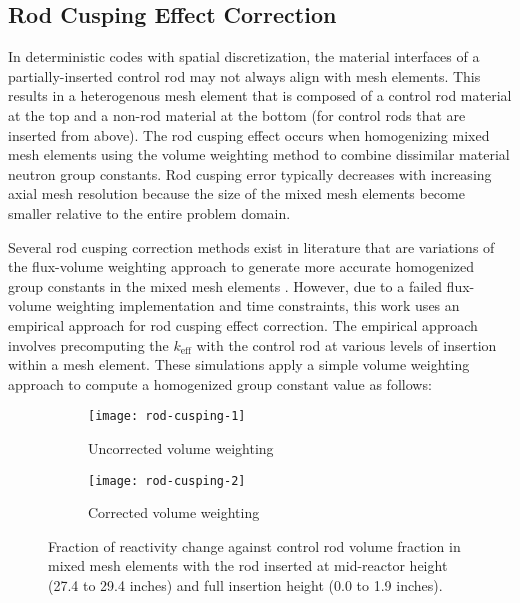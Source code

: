 \subsection{Rod Cusping Effect Correction}

In deterministic codes with spatial discretization, the material interfaces of a partially-inserted
control rod may not always align with mesh elements. This results in a heterogenous
mesh element that is composed of a control rod material at the top and a non-rod material at the
bottom (for control rods that are inserted from above). The rod cusping effect occurs when
homogenizing mixed mesh elements using the volume weighting method to combine dissimilar material
neutron group constants. Rod cusping error typically decreases with increasing axial mesh
resolution because the size of the mixed mesh elements become smaller relative to the entire
problem domain.

Several rod cusping correction methods exist in literature that are variations of the flux-volume
weighting approach to generate more accurate homogenized group constants in the mixed mesh
elements \cite{yamamoto_cell_2004, graham_subplane_2018, schunert_control_2019}. However, due to
a failed flux-volume weighting implementation and time constraints, this work uses an empirical
approach for rod cusping effect correction. The empirical approach involves precomputing the
$k_\text{eff}$ with the control rod at various levels of insertion within a mesh element. These
simulations apply a simple volume weighting approach to compute a homogenized group constant value
as follows:

\begin{figure}[t]
    \centering
    \begin{subfigure}[t]{.49\textwidth}
        \centering
        \texttt{[image: rod-cusping-1]}
        \caption{Uncorrected volume weighting}
        \label{fig:rod-cusping-1}
    \end{subfigure}
    \hfill
    \begin{subfigure}[t]{.49\textwidth}
        \centering
        \texttt{[image: rod-cusping-2]}
        \caption{Corrected volume weighting}
        \label{fig:rod-cusping-2}
    \end{subfigure}
    \caption{Fraction of reactivity change against control rod volume fraction in mixed mesh
    elements with the rod inserted at mid-reactor height (27.4 to 29.4 inches) and full insertion
    height (0.0 to 1.9 inches).}
    \label{fig:rod-cusping}
\end{figure}

